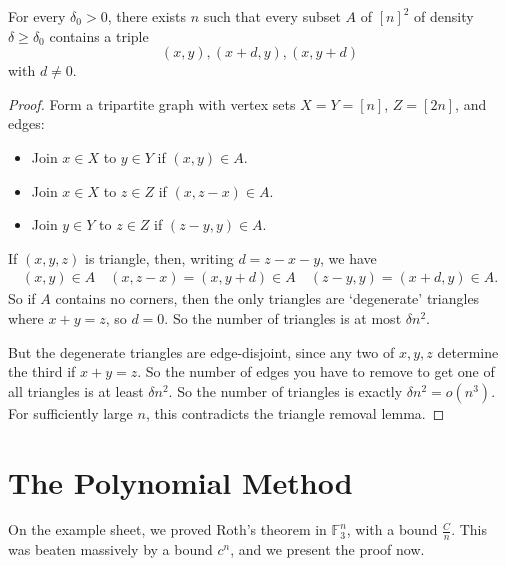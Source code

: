 \documentclass{article}
\newcommand{\1}[1]{\mathbbm{1}_{#1}}
\begin{document}
\begin{nthm}
  For every $\delta_0>0$, there exists $n$ such that every subset $A$ of $[n]^2$ of density $\delta \geq \delta_0$ contains a triple
  \begin{equation*}
    (x,y), (x+d,y), (x,y+d)
  \end{equation*}
  with $d \neq 0$.
  \begin{center}
  \end{center}
\end{nthm}

\begin{proof}
  Form a tripartite graph with vertex sets $X=Y=[n]$, $Z=[2n]$, and edges:
  \begin{itemize}
    \item Join $x \in X$ to $y \in Y$ if $(x,y) \in A$.
    \item Join $x \in X$ to $z \in Z$ if $(x,z-x) \in A$.
    \item Join $y \in Y$ to $z \in Z$ if $(z-y,y) \in A$.
  \end{itemize}
  If $(x,y,z)$ is triangle, then, writing $d  = z-x-y$, we have
  \begin{align*}
    (x,y) \in A \quad (x,z-x) = (x,y+d) \in A \quad (z-y,y) = (x+d,y) \in A.
  \end{align*}
  So if $A$ contains no corners, then the only triangles are `degenerate' triangles where $x+y=z$, so $d=0$.
  So the number of triangles is at most $\delta n^2$.

  But the degenerate triangles are edge-disjoint, since any two of $x,y,z$ determine the third if $x+y=z$.
  So the number of edges you have to remove to get one of all triangles is at least $\delta n^2$.
  So the number of triangles is exactly $\delta n^2 = o(n^3)$.
  For sufficiently large $n$, this contradicts  the triangle removal lemma.
\end{proof}

\clearpage
\section{The Polynomial Method}
On the example sheet, we proved Roth's theorem in $\mathbb{F}_3^n$, with a bound $\frac{C}{n}$.
This was beaten massively by a bound $c^n$, and we present the proof now.
\end{document}
